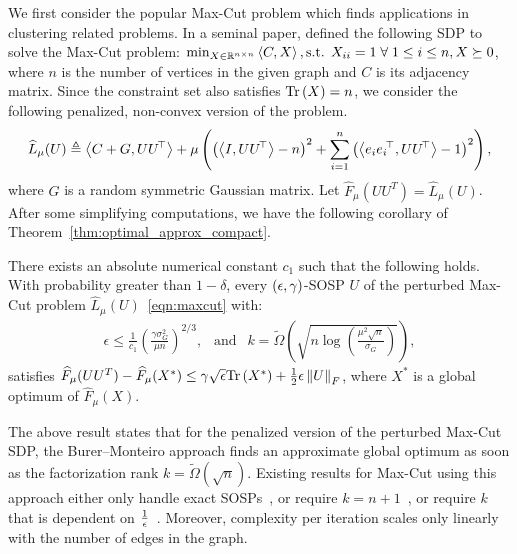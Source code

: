 We first consider the popular Max-Cut problem which finds applications in clustering related problems. In a seminal paper, \cite{goemans1995improved} defined the following SDP to solve the Max-Cut problem: $\min_{X\in \mathbb{R}^{n\times n}} \left\langle C, X \right\rangle, \mbox{s.t. } X_{ii} = 1 \; \forall \; 1 \leq i \leq n, X \succeq 0 $, where $n$ is the number of vertices in the given graph and $C$ is its adjacency matrix. Since the constraint set also satisfies $\mathrm{Tr}\left(X\right)=n$, we consider the following penalized, non-convex version of the problem.
\begin{align}
	\widehat{L}_{\mu}(U) \triangleq \left\langle C+G, U{U}^{\!\top} \right\rangle + \mu\left(\left(\left\langle I, U{U}^{\!\top} \right\rangle-n\right)^2 + \sum_{i=1}^{n}\left(\left\langle e_i {e_i}^{\!\top}, U{U}^{\!\top} \right\rangle-1\right)^2\right),\label{eqn:maxcut}
\end{align}
where $G$ is a random symmetric Gaussian matrix.  Let $\widehat F_{\mu}(UU^T) = \widehat L_{\mu} (U)$. After some simplifying computations, we have the following corollary of Theorem~\ref{thm:optimal_approx_compact}.
\begin{corollary}\label{cor:maxcut}
There exists an absolute numerical constant $c_1$ such that the following holds. With probability greater than $1-\delta$,
every $(\epsilon, \gamma)$-SOSP $U$ of the perturbed Max-Cut problem $\widehat{L}_{\mu}(U)$~\eqref{eqn:maxcut} with:
\begin{align*}\epsilon \leq \frac{1}{c_1} \left(\frac{\gamma \sigma_G^2}{\mu n}\right)^{2/3},~~ \text{ and } ~~  k = \tilde{\Omega} \left( \sqrt{n \log\left(\frac{\mu^2 \sqrt{n}}{\sigma_G}\right)}\right),
\end{align*}
satisfies $	\widehat{F}_{\mu}(UU^T) - \widehat{F}_{\mu}(X^*) \leq \gamma \sqrt{\epsilon} \mathrm{Tr}\left(X^*\right) +\frac{1}{2} \epsilon \left\lVert{U}\right\rVert_F$, where $X^*$ is a global optimum of $\widehat{F}_{\mu}(X)$.
\end{corollary}
The above result states that for the penalized version of the perturbed Max-Cut SDP, the Burer--Monteiro approach finds an approximate global optimum as soon as the factorization rank $k = \tilde{\Omega}(\sqrt{n})$. Existing results for Max-Cut using this approach either only handle exact SOSPs~\citep{boumal2016non}, or require $k=n+1$~\citep{boumal2016globalrates}, or require $k$ that is dependent on $\frac{1}{\epsilon}$~\citep{pmlr-v65-mei17a}. Moreover, complexity per iteration scales only linearly with the number of edges in the graph. %


